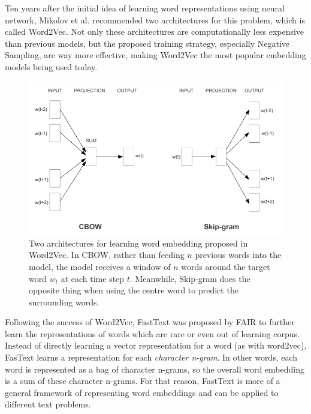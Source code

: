 Ten years after the initial idea of learning word representations using neural network, Mikolov et al. \cite{word2vec} recommended two architectures for this problem, which is called Word2Vec. Not only these architectures are computationally less expensive than previous models, but the proposed training strategy, especially Negative Sampling, are way more effective, making Word2Vec the most popular embedding models being used today. 
\begin{figure}
\centering
\includegraphics[scale=0.5]{charts/word2vec.png}
\caption{Two architectures for learning word embedding proposed in Word2Vec. In CBOW, rather than feeding $n$ previous words into the model, the model receives a window of $n$ words around the target word $w_t$ at each time step $t$. Meanwhile, Skip-gram does the opposite thing when using the centre word to predict the surrounding words.}
\end{figure}

Following the success of Word2Vec, FastText \cite{fasttext} was proposed by FAIR to further learn the representations of words which are rare or even out of learning corpus. Instead of directly learning a vector representation for a word (as with word2vec), FasText learns a representation for each \textit{character n-gram}. In other words, each word is represented as a bag of character n-grams, so the overall word embedding is a sum of these character n-grams. For that reason, FastText is more of a general framework of representing word embeddings and can be applied to different text problems.

